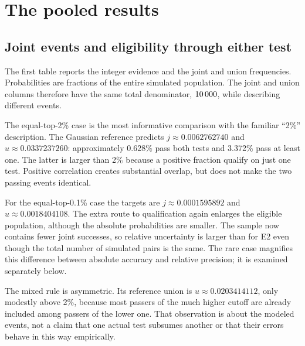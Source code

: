 \chapter{The pooled results}
\label{sec:towers-pooled}

\section{Joint events and eligibility through either test}

The first table reports the integer evidence and the joint and union
frequencies. Probabilities are fractions of the entire simulated population.
The joint and union columns therefore have the same total denominator,
\(10\,000\), while describing different events.


The equal-top-2\% case is the most informative comparison with the familiar
``2\%'' description. The Gaussian reference predicts
\(j\approx0.0062762740\) and
\(u\approx0.0337237260\): approximately 0.628\% pass both tests and
3.372\% pass at least one. The latter is larger than 2\% because a positive
fraction qualify on just one test. Positive correlation creates substantial
overlap, but does not make the two passing events identical.

For the equal-top-0.1\% case the targets are
\(j\approx0.0001595892\) and
\(u\approx0.0018404108\). The extra route to qualification again enlarges
the eligible population, although the absolute probabilities are smaller.
The sample now contains fewer joint successes, so relative uncertainty is
larger than for E2 even though the total number of simulated pairs is the same.
The rare case magnifies this difference between absolute accuracy and
relative precision; it is examined separately below.

The mixed rule is asymmetric. Its reference union is
\(u\approx0.0203414112\), only modestly above 2\%, because most passers of
the much higher cutoff are already included among passers of the lower one.
That observation is about the modeled events, not a claim that one actual
test subsumes another or that their errors behave in this way empirically.

